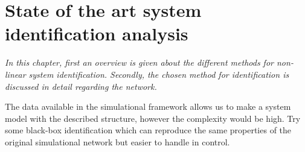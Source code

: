 \chapter{State of the art system identification analysis}
\label{identification_methods}

\emph{In this chapter, first an overview is given about the different methods for non-linear system identification. Secondly, the chosen method for identification is discussed in detail regarding the network.}

The data available in the simulational framework allows us to make a system model with the described structure, however the complexity would be high. Try some black-box identification which can reproduce the same properties of the original simulational network but easier to handle in control. 